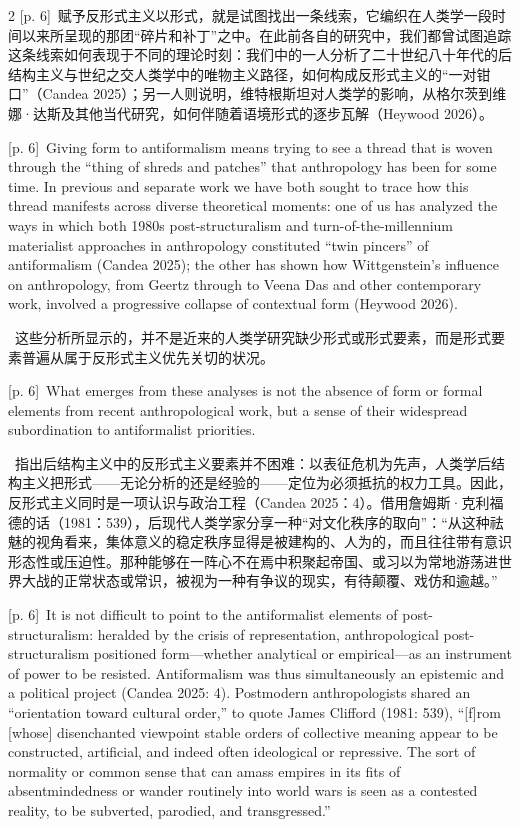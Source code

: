\documentclass[10pt,a4paper]{article}
\begin{document}
\begin{paracol}{2}
{\scriptsize\color{gray} [p. 6]}\ 赋予反形式主义以形式，就是试图找出一条线索，它编织在人类学一段时间以来所呈现的那团“碎片和补丁”之中。在此前各自的研究中，我们都曾试图追踪这条线索如何表现于不同的理论时刻：我们中的一人分析了二十世纪八十年代的后结构主义与世纪之交人类学中的唯物主义路径，如何构成反形式主义的“一对钳口”（Candea 2025）；另一人则说明，维特根斯坦对人类学的影响，从格尔茨到维娜·达斯及其他当代研究，如何伴随着语境形式的逐步瓦解（Heywood 2026）。\par
\switchcolumn
{\scriptsize\color{gray} [p. 6]}\ Giving form to antiformalism means trying to see a thread that is woven through the “thing of shreds and patches” that anthropology has been for some time. In previous and separate work we have both sought to trace how this thread manifests across diverse theoretical moments: one of us has analyzed the ways in which both 1980s post-structuralism and turn-of-the-millennium materialist approaches in anthropology constituted “twin pincers” of antiformalism (Candea 2025); the other has shown how Wittgenstein’s influence on anthropology, from Geertz through to Veena Das and other contemporary work, involved a progressive collapse of contextual form (Heywood 2026).\par
\switchcolumn*
{\scriptsize\color{gray} [p. 6]}\ 这些分析所显示的，并不是近来的人类学研究缺少形式或形式要素，而是形式要素普遍从属于反形式主义优先关切的状况。\par
\switchcolumn
{\scriptsize\color{gray} [p. 6]}\ What emerges from these analyses is not the absence of form or formal elements from recent anthropological work, but a sense of their widespread subordination to antiformalist priorities.\par
\switchcolumn*
{\scriptsize\color{gray} [p. 6]}\ 指出后结构主义中的反形式主义要素并不困难：以表征危机为先声，人类学后结构主义把形式——无论分析的还是经验的——定位为必须抵抗的权力工具。因此，反形式主义同时是一项认识与政治工程（Candea 2025：4）。借用詹姆斯·克利福德的话（1981：539），后现代人类学家分享一种“对文化秩序的取向”：“从这种祛魅的视角看来，集体意义的稳定秩序显得是被建构的、人为的，而且往往带有意识形态性或压迫性。那种能够在一阵心不在焉中积聚起帝国、或习以为常地游荡进世界大战的正常状态或常识，被视为一种有争议的现实，有待颠覆、戏仿和逾越。”\par
\switchcolumn
{\scriptsize\color{gray} [p. 6]}\ It is not difficult to point to the antiformalist elements of post-structuralism: heralded by the crisis of representation, anthropological post-structuralism positioned form—whether analytical or empirical—as an instrument of power to be resisted. Antiformalism was thus simultaneously an epistemic and a political project (Candea 2025: 4). Postmodern anthropologists shared an “orientation toward cultural order,” to quote James Clifford (1981: 539), “[f]rom [whose] disenchanted viewpoint stable orders of collective meaning appear to be constructed, artificial, and indeed often ideological or repressive. The sort of normality or common sense that can amass empires in its fits of absentmindedness or wander routinely into world wars is seen as a contested reality, to be subverted, parodied, and transgressed.”\par

\end{paracol}
\end{document}
